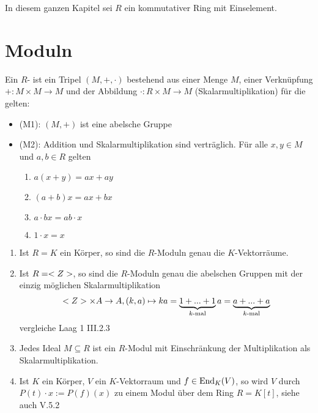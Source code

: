 In diesem ganzen Kapitel sei $R$ ein kommutativer Ring mit Einselement.

\section{Moduln}

\begin{definition}
	Ein $R$- ist ein Tripel $(M,+,\cdot)$ bestehend aus einer Menge $M$, einer Verknüpfung $+:M\times M\to M$ und der Abbildung $\cdot:R\times M\to M$ (Skalarmultiplikation) für die gelten:
	\begin{itemize}
		\item (M1): $(M,+)$ ist eine abelsche Gruppe
		\item (M2): Addition und Skalarmultiplikation sind verträglich. Für alle $x,y\in M$ und $a,b\in R$ gelten
		\begin{enumerate}
			\item $a(x+y)=ax+ay$
			\item $(a+b)x=ax+bx$
			\item $a\cdot bx=ab\cdot x$
			\item $1\cdot x=x$
		\end{enumerate}
	\end{itemize}
\end{definition}

\begin{example}
	\begin{enumerate}
		\item Ist $R=K$ ein Körper, so sind die $R$-Moduln genau die $K$-Vektorräume.
		\item Ist $R=<Z>$, so sind die $R$-Moduln genau die abelschen Gruppen mit der einzig möglichen Skalarmultiplikation 
		\begin{align}
			<Z>\times A\to A,(k,a)\mapsto ka=\underbrace{1+...+1}_{k\text{-mal}}a=\underbrace{a+...+a}_{k\text{-mal}}\notag
		\end{align}
		vergleiche Laag 1 III.2.3 %
		\item Jedes Ideal $M\subseteq R$ ist ein $R$-Modul mit Einschränkung der Multiplikation als Skalarmultiplikation.
		\item Ist $K$ ein Körper, $V$ ein $K$-Vektorraum und $f\in\operatorname{End}_K(V)$, so wird $V$ durch $P(t)\cdot x:=P(f)(x)$ zu einem Modul über dem Ring $R=K[t]$, siehe auch V.5.2 %
	\end{enumerate}
\end{example}

